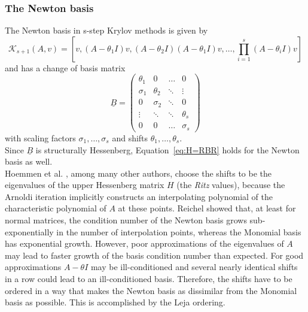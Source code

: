 \documentclass{scrartcl}
\numberwithin{equation}{section}
\begin{document}
\subsubsection{The Newton basis} \label{sec:Newtonbasis}
The Newton basis in s-step Krylov methods is given by 
\begin{equation*}
\mathcal{K}_{s + 1}(A, v) = \left[v, (A - \theta_1 I )v, (A - \theta_2 I )(A - \theta_1 I )v, \ldots, \displaystyle\prod_{i = 1}^s (A - \theta_i I )v\right]
\end{equation*}
and has a change of basis matrix
\begin{equation}
\underline{B} = 
\begin{pmatrix}
\theta_1 & 0 & \ldots & 0 \\
\sigma_1 & \theta_2 & \ddots & \vdots \\
0 & \sigma_2 & \ddots & 0 \\
\vdots & \ddots & \ddots & \theta_s \\
0 & 0 & \ldots & \sigma_s 
\end{pmatrix}
\end{equation}
with scaling factors $\sigma_1, \ldots, \sigma_s$ and shifts $\theta_1, \ldots, \theta_s$.\\

Since $\underline{B}$ is structurally Hessenberg, Equation~\eqref{eq:H=RBR} holds for the Newton basis as well.\\

Hoemmen et al. \cite{Hoemmen:2010:CKS:1970638}, among many other authors, choose the shifts to be the eigenvalues of the upper Hessenberg matrix $H$ (the \textit{Ritz} values), because the Arnoldi iteration implicitly constructs an interpolating polynomial of the characteristic polynomial of $A$ at these points. Reichel \cite{Reichel1990} showed that, at least for normal matrices, the condition number of the Newton basis grows sub-exponentially in the number of interpolation points, whereas the Monomial basis has exponential growth. However, poor approximations of the eigenvalues of $A$ may lead to faster growth of the basis condition number than expected. For good approximations $A - \theta I$ may be ill-conditioned and several nearly identical shifts in a row could lead to an ill-conditioned basis. Therefore, the shifts have to be ordered in a way that makes the Newton basis as dissimilar from the Monomial basis as possible. This is accomplished by the Leja ordering.
\end{document}
